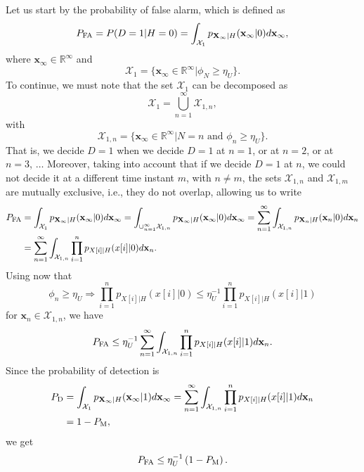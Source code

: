 Let us start by the probability of false alarm, which is defined as
\begin{equation*}
	P_{\text{FA}} = P(D = 1 | H = 0) = \int_{\mathcal{X}_1} p_{\mathbf{X}_{\infty} | H} (\mathbf{x}_{\infty} | 0) d \mathbf{x}_{\infty},
\end{equation*}
where $\mathbf{x}_{\infty} \in \mathbb{R}^{\infty}$ and
\begin{equation*}
	\mathcal{X}_1 = \{ \mathbf{x}_{\infty} \in \mathbb{R}^{\infty} | \phi_{N} \geq  \eta_U  \}.
\end{equation*}
To continue, we must note that the set $\mathcal{X}_1$ can be decomposed as
\begin{equation*}
	\mathcal{X}_1 = \mathop{\bigcup}\limits_{n = 1}^{\infty} \mathcal{X}_{1,n},
\end{equation*}
with
\begin{equation*}
	\mathcal{X}_{1,n} = \{ \mathbf{x}_{\infty} \in \mathbb{R}^{\infty} |N = n \text{ and } \phi_{n} \geq  \eta_U  \}.
\end{equation*}
That is, we decide $D = 1$ when we decide $D = 1$ at $n = 1$, or at $n = 2$, or at $n = 3$, $\ldots$ Moreover, taking into account that if we decide $D = 1$ at $n$, we could not decide it at a different time instant $m$, with $n \neq m$, the sets $\mathcal{X}_{1,n}$ and $\mathcal{X}_{1,m}$ are mutually exclusive, i.e., they do not overlap, allowing us to write
\begin{align*}
	P_{\text{FA}} &= \int_{\mathcal{X}_1} p_{\mathbf{X}_{\infty} | H} (\mathbf{x}_{\infty} | 0) d \mathbf{x}_{\infty} 
	= \int_{\cup_{n = 1}^{\infty} \mathcal{X}_{1,n}} p_{\mathbf{X}_{\infty} | H} (\mathbf{x}_{\infty} | 0) d \mathbf{x}_{\infty} 
	= \sum_{n = 1}^{\infty}  \int_{\mathcal{X}_{1,n}} p_{\mathbf{X}_{n} | H} (\mathbf{x}_{n} | 0) d \mathbf{x}_{n} \\
	&= \sum_{n = 1}^{\infty}  \int_{\mathcal{X}_{1,n}} \prod_{i = 1}^{n} p_{X[i] | H}(x[i] | 0)  d \mathbf{x}_{n}.
\end{align*}
Using now that
\begin{equation*}
	\phi_n \geq \eta_U \Rightarrow   \prod_{i = 1}^{n} p_{X[i] | H}(x[i] | 0) \leq \eta_U^{-1} \prod_{i = 1}^{n} p_{X[i] | H}(x[i] | 1)
\end{equation*}
for $\mathbf{x}_n \in \mathcal{X}_{1,n}$, we have 
\begin{equation*}
	P_{\text{FA}} \leq  \eta_U^{-1} \sum_{n = 1}^{\infty}  \int_{\mathcal{X}_{1,n}}  \prod_{i = 1}^{n} p_{X[i] | H}(x[i] | 1)  d \mathbf{x}_{n}.
\end{equation*}
Since the probability of detection is
\begin{align*}
	P_{\text{D}} &= \int_{\mathcal{X}_1} p_{\mathbf{X}_{\infty} | H} (\mathbf{x}_{\infty} | 1) d \mathbf{x}_{\infty} 
	= \sum_{n = 1}^{\infty}  \int_{\mathcal{X}_{1,n}} \prod_{i = 1}^{n} p_{X[i] | H}(x[i] | 1)  d \mathbf{x}_{n} \\
	&= 1 - P_{\text{M}},
\end{align*}
we get
\begin{equation}
	\label{eq:bound_pfa}
	P_{\text{FA}} \leq  \eta_U^{-1} \left(1 - P_{\text{M}}\right).
\end{equation}

